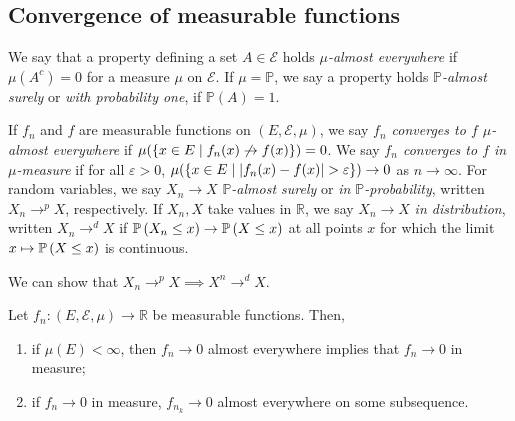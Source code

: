 \subsection{Convergence of measurable functions}
\begin{definition}
	We say that a property defining a set \( A \in \mathcal E \) holds \emph{\( \mu \)-almost everywhere} if \( \mu(A^c) = 0 \) for a measure \( \mu \) on \( \mathcal E \).
	If \( \mu = \mathbb P \), we say a property holds \emph{\( \mathbb P \)-almost surely} or \emph{with probability one}, if \( \mathbb P(A) = 1 \).
\end{definition}
\begin{definition}
	If \( f_n \) and \( f \) are measurable functions on \( (E,\mathcal E,\mu) \), we say \emph{\( f_n \) converges to \( f \) \( \mu \)-almost everywhere} if \( \mu(\qty{x \in E \mid f_n(x) \not\to f(x)}) = 0 \).
	We say \emph{\( f_n \) converges to \( f \) in \( \mu \)-measure} if for all \( \varepsilon > 0 \), \( \mu(\qty{x\in E \mid \abs{f_n(x) - f(x)} > \varepsilon}) \to 0 \) as \( n \to \infty \).
	For random variables, we say \( X_n \to X \) \emph{\( \mathbb P \)-almost surely} or \emph{in \( \mathbb P \)-probability}, written \( X_n \to^p X \), respectively.
	If \( X_n, X \) take values in \( \mathbb R \), we say \( X_n \to X \) \emph{in distribution}, written \( X_n \to^d X \) if \( \mathbb{P}\left({X_n \leq x}\right) \to \mathbb{P}\left({X \leq x}\right) \) at all points \( x \) for which the limit \( x \mapsto \mathbb{P}\left({X \leq x}\right) \) is continuous.
\end{definition}
We can show that \( X_n \to^p X \implies X^n \to^d X \).
\begin{theorem}
	Let \( f_n \colon (E,\mathcal E,\mu) \to \mathbb R \) be measurable functions.
	Then,
	\begin{enumerate}
		\item if \( \mu(E) < \infty \), then \( f_n \to 0 \) almost everywhere implies that \( f_n \to 0 \) in measure;
		\item if \( f_n \to 0 \) in measure, \( f_{n_k} \to 0 \) almost everywhere on some subsequence.
	\end{enumerate}
\end{theorem}
